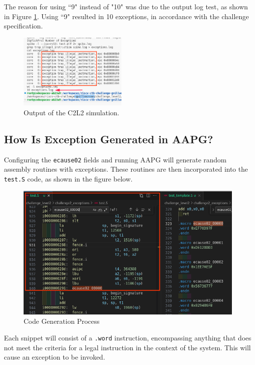 The reason for using ``9" instead of "10" was due to the output log test, as shown in Figure \ref{fig:output_simulation}. Using ``9" resulted in 10 exceptions, in accordance with the challenge specification. 

\begin{figure}[h]
  \centering
  \includegraphics[width=0.47\textwidth]{./c2l2_img/img1.png}
  \caption{Output of the C2L2 simulation.}
  \label{fig:output_simulation}
\end{figure}

\subsection{How Is Exception Generated in AAPG?}

Configuring the \texttt{ecause02} fields and running AAPG will generate random assembly routines with exceptions. These routines are then incorporated into the \texttt{test.S} code, as shown in the figure below.

\begin{figure}[h]
  \centering
  \includegraphics[width=1\linewidth]{./c2l2_img/expl.png}
  \caption{Code Generation Process}
\end{figure}

Each snippet will consist of a \texttt{.word} instruction, encompassing anything that does not meet the criteria for a legal instruction in the context of the system. This will cause an exception to be invoked.

